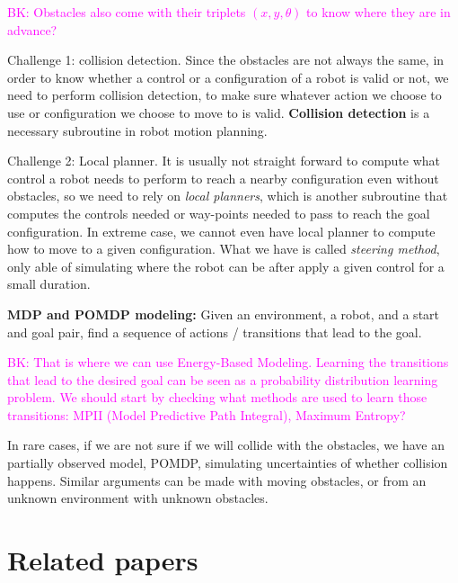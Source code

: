 \documentclass{article}
\begin{document}
\textcolor{magenta}{BK: Obstacles also come with their triplets $(x, y, \theta)$ to know where they are in advance?}

Challenge 1: collision detection. Since the obstacles are not always the same, in order to know whether a control or a configuration of a robot is valid or not, we need to perform collision detection, to make sure whatever action we choose to use or configuration we choose to move to is valid. \textbf{Collision detection} is a necessary subroutine in robot motion planning. 

Challenge 2: Local planner. It is usually not straight forward to compute what control a robot needs to perform to reach a nearby configuration even without obstacles, so we need to rely on {\em local planners}, which is another subroutine that computes the controls needed or way-points needed to pass to reach the goal configuration. 
In extreme case, we cannot even have local planner to compute how to move to a given configuration. What we have is called \emph{steering method}, only able of simulating where the robot can be after apply a given control for a small duration.

\noindent\textbf{MDP and POMDP modeling:} Given an environment, a robot, and a start and goal pair, find a sequence of actions / transitions that lead to the goal. 

\textcolor{magenta}{BK: That is where we can use Energy-Based Modeling. Learning the transitions that lead to the desired goal can be seen as a probability distribution learning problem.
We should start by checking what methods are used to learn those transitions: MPII (Model Predictive Path Integral), Maximum Entropy? }

In rare cases, if we are not sure if we will collide with the obstacles, we have an partially observed model, POMDP, simulating uncertainties of whether collision happens. Similar arguments can be made with moving obstacles, or from an unknown environment with unknown obstacles. 

\section{Related papers}
\end{document}
